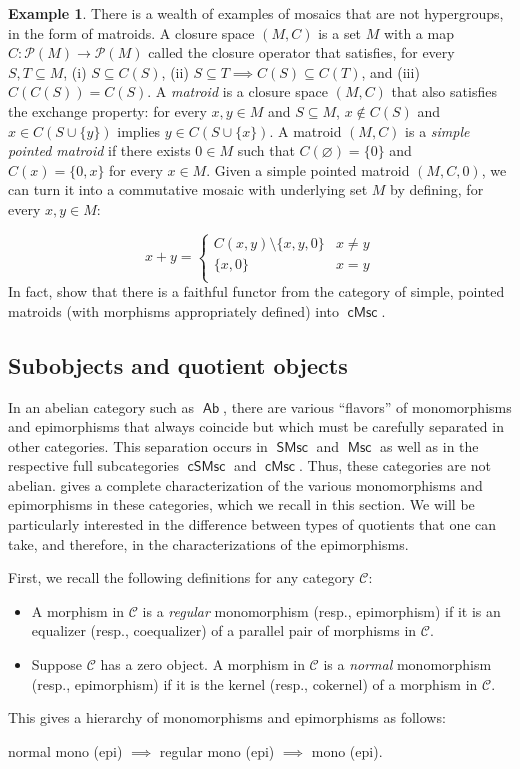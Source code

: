 \documentclass[reqno]{amsart}
\newcommand{\cat}[1]{\ensuremath{\mathsf{#1}}}
\newcommand{\C}{\mathcal{C}}
\DeclareMathOperator{\Ab}{\cat{Ab}}
\DeclareMathOperator{\Msc}{\cat{Msc}}
\DeclareMathOperator{\cMsc}{\cat{cMsc}}
\DeclareMathOperator{\cSMsc}{\cat{cSMsc}}
\DeclareMathOperator{\SMsc}{\cat{SMsc}}
\renewcommand{\P}{\mathcal{P}}
\numberwithin{equation}{section}
\theoremstyle{plain}
\theoremstyle{definition}
\newtheorem{example}[equation]{Example}
\begin{document}
\begin{example}
        There is a wealth of examples of mosaics that are not hypergroups, in the form of matroids. A closure space $(M, C)$ is a set $M$ with a map $C:\P(M)\to \P(M)$ called the closure operator that satisfies, for every $S, T\subseteq M$, (i) $S\subseteq C(S)$, (ii) $S\subseteq T \implies C(S)\subseteq C(T)$, and (iii) $C(C(S)) = C(S)$. A \textit{matroid} is a closure space $(M, C)$ that also satisfies the exchange property: for every $x, y\in M$ and $S\subseteq M$, $x\notin C(S)$ and $x\in C(S\cup \{y\})$ implies $y\in C(S\cup \{x\}).$ A matroid $(M, C)$ is a \textit{simple pointed matroid} if there exists $0\in M$ such that $C(\varnothing) = \{0\}$ and $C(x) = \{0, x\}$ for every $x\in M$. Given a simple pointed matroid $(M, C, 0)$, we can turn it into a commutative mosaic with underlying set $M$ by defining, for every $x, y\in M$:

         \[ x + y = \begin{cases} 
            C(x, y)\setminus \{x, y, 0\} & x\neq y \\
            \{x, 0\} & x=y \\
        \end{cases}
        \]    
     In fact, \cite{NakamuraReyes} show that there is a faithful functor from the category of simple, pointed matroids (with morphisms appropriately defined) into $\cMsc$.
\end{example}

\subsection{Subobjects and quotient objects}

 In an abelian category such as $\Ab$, there are various ``flavors'' of monomorphisms and epimorphisms that always coincide but which must be carefully separated in other categories. This separation occurs in $\SMsc$ and $\Msc$ as well as in the respective full subcategories $\cSMsc$ and $\cMsc$. Thus, these categories are not abelian. \cite{NakamuraReyes} gives a complete characterization of the various monomorphisms and epimorphisms in these categories, which we recall in this section. We will be particularly interested in the difference between types of quotients that one can take, and therefore, in the characterizations of the epimorphisms. 


First, we recall the following definitions for any category $\C$:
\begin{itemize}
\item A morphism in $\C$ is a \emph{regular} monomorphism (resp., epimorphism) if it is an equalizer (resp., coequalizer) of a parallel pair of morphisms in $\C$.
\item Suppose $\C$ has a zero object. A morphism in $\C$ is a \emph{normal} monomorphism (resp., epimorphism) if it is the kernel (resp., cokernel) of a morphism in $\C$.
\end{itemize}
This gives a hierarchy of monomorphisms and epimorphisms as follows:
\begin{center}
normal mono (epi) $\implies$ regular mono (epi) $\implies$ mono (epi).
\end{center}
\end{document}
